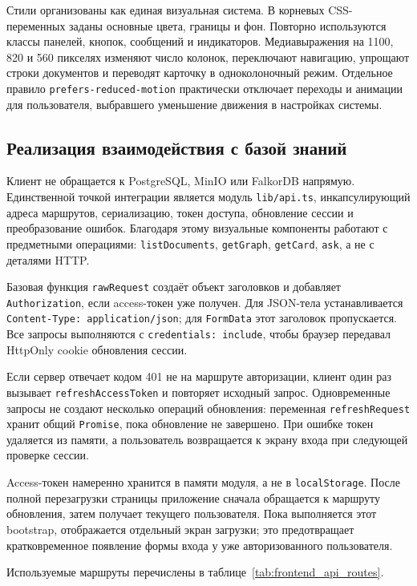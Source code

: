 Стили организованы как единая визуальная система. В корневых CSS-переменных заданы основные цвета, границы и фон. Повторно используются классы панелей, кнопок, сообщений и индикаторов. Медиавыражения на 1100, 820 и 560 пикселях изменяют число колонок, переключают навигацию, упрощают строки документов и переводят карточку в одноколоночный режим. Отдельное правило \texttt{prefers-reduced-motion} практически отключает переходы и анимации для пользователя, выбравшего уменьшение движения в настройках системы.

\subsection{Реализация взаимодействия с базой знаний}

Клиент не обращается к PostgreSQL, MinIO или FalkorDB напрямую. Единственной точкой интеграции является модуль \texttt{lib/api.ts}, инкапсулирующий адреса маршрутов, сериализацию, токен доступа, обновление сессии и преобразование ошибок. Благодаря этому визуальные компоненты работают с предметными операциями: \texttt{listDocuments}, \texttt{getGraph}, \texttt{getCard}, \texttt{ask}, а не с деталями HTTP.

Базовая функция \texttt{rawRequest} создаёт объект заголовков и добавляет \texttt{Authorization}, если access-токен уже получен. Для JSON-тела устанавливается \texttt{Content-Type: application/json}; для \texttt{FormData} этот заголовок пропускается. Все запросы выполняются с \texttt{credentials: include}, чтобы браузер передавал HttpOnly cookie обновления сессии.

Если сервер отвечает кодом 401 не на маршруте авторизации, клиент один раз вызывает \texttt{refreshAccessToken} и повторяет исходный запрос. Одновременные запросы не создают несколько операций обновления: переменная \texttt{refreshRequest} хранит общий \texttt{Promise}, пока обновление не завершено. При ошибке токен удаляется из памяти, а пользователь возвращается к экрану входа при следующей проверке сессии.

Access-токен намеренно хранится в памяти модуля, а не в \texttt{localStorage}. После полной перезагрузки страницы приложение сначала обращается к маршруту обновления, затем получает текущего пользователя. Пока выполняется этот bootstrap, отображается отдельный экран загрузки; это предотвращает кратковременное появление формы входа у уже авторизованного пользователя.

Используемые маршруты перечислены в таблице~\ref{tab:frontend_api_routes}.

